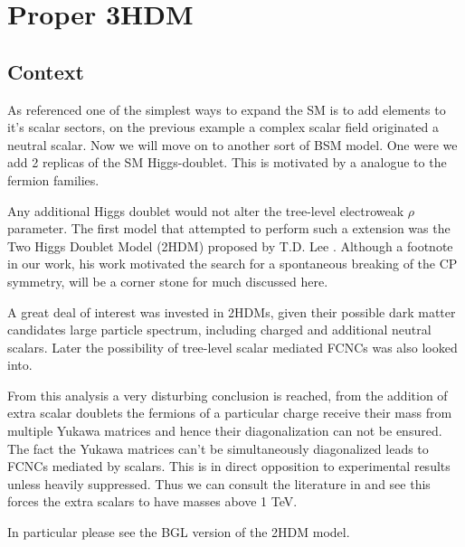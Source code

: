 
\newpage 

\chapter{Proper 3HDM}

\section{Context}

% 
% 

As referenced one of the simplest ways to expand the SM is to add elements to it's scalar sectors, on the previous example a complex scalar field originated a neutral scalar. Now we will move on to another sort of BSM model. One were we add 2 replicas of the SM Higgs-doublet. This is motivated by a analogue to the fermion families. 

Any additional Higgs doublet would not alter the tree-level electroweak $\rho$ parameter. The first model that attempted to perform such a extension 
was the Two Higgs Doublet Model (2HDM) proposed by T.D. Lee \cite{Lee1973}.  Although a footnote in our work, his work motivated the search for a spontaneous breaking of the CP symmetry, will be a corner stone for much discussed here. 

A great deal of interest was invested in 2HDMs, given their possible dark matter candidates large particle spectrum, including charged and additional neutral scalars. Later the possibility of tree-level scalar mediated FCNCs was also looked into.

From this analysis a very disturbing conclusion is reached, from the addition of extra scalar doublets the fermions of a particular charge receive their mass from multiple Yukawa matrices and hence their diagonalization can not be ensured. The fact the Yukawa matrices can't be simultaneously diagonalized leads to FCNCs mediated by scalars. This is in direct opposition to experimental results unless heavily suppressed. Thus we can consult the literature in \cite{Branco:1999fs} and see this forces the extra scalars to have masses above 1 TeV.  

In particular please see the BGL version of the 2HDM model. 

